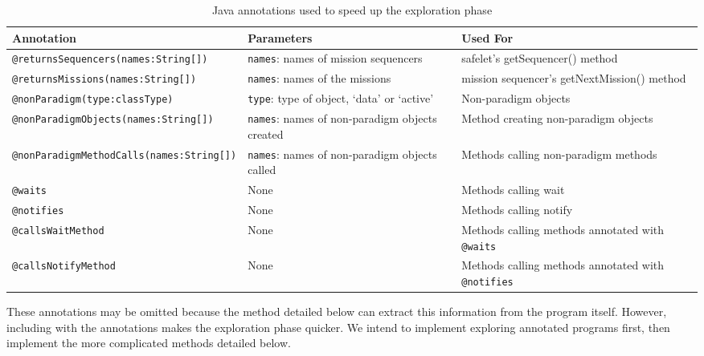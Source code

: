 \documentclass[10pt,a4paper]{article}
\begin{document}
\begin{table}[h]


\begin{tabular}{| l | p{4cm} | p{5cm} |}
\hline
 Annotation 											& Parameters																	& Used For \\
 \hline
 
 \texttt{@returnsSequencers(names:String[])} 			& \texttt{names}: names of mission sequencers 								& safelet's {getSequencer()} method \\ 
 
 \texttt{@returnsMissions(names:String[])} 				& \texttt{names}: names of the missions		 								& mission sequencer's {getNextMission()} method \\
 
 \texttt{@nonParadigm(type:classType)} 					& \texttt{type}: type of object, `data' or `active'							& Non-paradigm objects \\
 
 \texttt{@nonParadigmObjects(names:String[])} 	& \texttt{names}: names of non-paradigm objects created						& Method creating non-paradigm objects \\
 
 \texttt{@nonParadigmMethodCalls(names:String[])} 	& \texttt{names}: names of non-paradigm objects called						& Methods calling non-paradigm methods \\
 
 \texttt{@waits}										& 	None																	& Methods calling wait \\
 
  \texttt{@notifies} 									&	None																	& Methods calling notify \\
 
 \texttt{@callsWaitMethod} 								&	None																	& Methods calling methods annotated with \texttt{@waits}\\
 
 \texttt{@callsNotifyMethod} 							&	None																	& Methods calling methods annotated with \texttt{@notifies} \\
 
 \hline
\end{tabular}
\caption{Java annotations used to speed up the exploration phase}
\label{tab:annotations}
\end{table}


These annotations may be omitted because the method detailed below can extract this information from the program itself. However, including with the annotations makes the exploration phase quicker. We intend to implement exploring annotated programs first, then implement the more complicated methods detailed below.  
\end{document}
